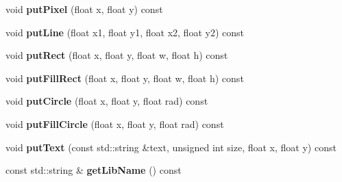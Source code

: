 \begin{DoxyCompactItemize}
void {\bfseries put\+Pixel} (float x, float y) const
\item 
\mbox{\label{class_libcaca_module_add7d76857c3a7bca75e5caf095666f7f}} 
void {\bfseries put\+Line} (float x1, float y1, float x2, float y2) const
\item 
\mbox{\label{class_libcaca_module_a69e9853dc66479ef731eb09199fb8172}} 
void {\bfseries put\+Rect} (float x, float y, float w, float h) const
\item 
\mbox{\label{class_libcaca_module_a3ffde8b9a15c977f09de9ba97fd66bf4}} 
void {\bfseries put\+Fill\+Rect} (float x, float y, float w, float h) const
\item 
\mbox{\label{class_libcaca_module_a049f4d9269bc9c1e6c7502d80bd6e9b5}} 
void {\bfseries put\+Circle} (float x, float y, float rad) const
\item 
\mbox{\label{class_libcaca_module_a4773eb389c5325d30be4f52a74675066}} 
void {\bfseries put\+Fill\+Circle} (float x, float y, float rad) const
\item 
\mbox{\label{class_libcaca_module_ac2726d1053a814f06efddcb36d6fadb4}} 
void {\bfseries put\+Text} (const std\+::string \&text, unsigned int size, float x, float y) const
\item 
\mbox{\label{class_libcaca_module_acc3921b8cfba7a78bf40bddf39759a4a}} 
const std\+::string \& {\bfseries get\+Lib\+Name} () const
\end{DoxyCompactItemize}
